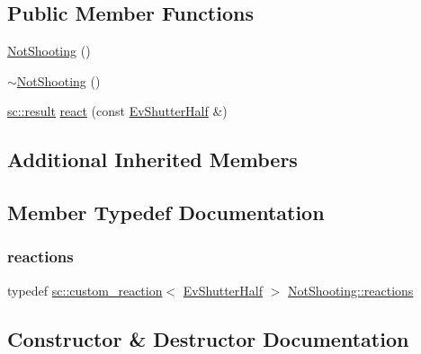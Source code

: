 \subsection*{Public Member Functions}
\begin{DoxyCompactItemize}
\item 
\mbox{\hyperlink{struct_not_shooting_ab36711d0c918467645054180de069082}{Not\+Shooting}} ()
\item 
\mbox{\hyperlink{struct_not_shooting_a8bed91848d90c0a886d0267bb72f79c0}{$\sim$\+Not\+Shooting}} ()
\item 
\mbox{\hyperlink{namespaceboost_1_1statechart_abe807f6598b614d6d87bb951ecd92331}{sc\+::result}} \mbox{\hyperlink{struct_not_shooting_a5e1f0754f43793e0e1119b9a974f4f0c}{react}} (const \mbox{\hyperlink{struct_ev_shutter_half}{Ev\+Shutter\+Half}} \&)
\end{DoxyCompactItemize}
\subsection*{Additional Inherited Members}


\subsection{Member Typedef Documentation}
\mbox{\label{struct_not_shooting_a6c02cc14896827aa0a1133ec77903de1}} 
\subsubsection{\texorpdfstring{reactions}{reactions}}
{\footnotesize\ttfamily typedef \mbox{\hyperlink{classboost_1_1statechart_1_1custom__reaction}{sc\+::custom\+\_\+reaction}}$<$ \mbox{\hyperlink{struct_ev_shutter_half}{Ev\+Shutter\+Half}} $>$ \mbox{\hyperlink{struct_not_shooting_a6c02cc14896827aa0a1133ec77903de1}{Not\+Shooting\+::reactions}}}



\subsection{Constructor \& Destructor Documentation}
\mbox{\label{struct_not_shooting_ab36711d0c918467645054180de069082}} 
